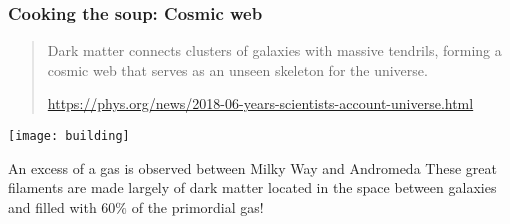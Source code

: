 \begin{frame}
  \frametitle{Cooking the soup: Cosmic web}
  \begin{quote}
    Dark matter connects clusters of galaxies with massive tendrils, forming a cosmic web that serves as an unseen skeleton for the universe.

\vspace{-0.3cm}    
    {\tiny \url{https://phys.org/news/2018-06-years-scientists-account-universe.html}}

    
  \end{quote}

\def\heifig{4.8cm}
\texttt{[image: building]} \hspace{2cm}


\begin{block}{An excess of a gas is observed between Milky Way and Andromeda}
  \scriptsize These great filaments are made largely of \alert{dark matter} located in the space between galaxies\\ and filled with $60\%$ of the \alert{primordial gas!} \hfill{}
  \end{block}
\end{frame}





